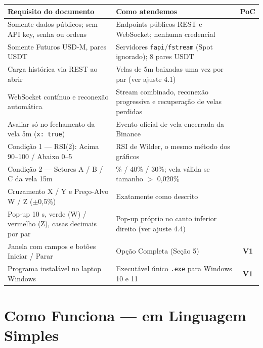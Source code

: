 \documentclass[11pt,a4paper]{article}
\newcommand{\icoCheck} {\textcolor{sinalW}{\ding{51}}}
\newcommand{\icoV}     {\textcolor{cyandk}{\textbf{V1}}}
\newcommand{\usdm}{USD\raisebox{0.15ex}{\textcircled{\raisebox{-0.05ex}{\tiny S}}}-M}
\begin{document}
\begin{center}
\small
\renewcommand{\arraystretch}{1.32}
\begin{tabularx}{\textwidth}{@{}>{\raggedright\arraybackslash}p{50mm} >{\raggedright\arraybackslash}X c@{}}
  \toprule
  \rowcolor{navy!8}
  \textbf{Requisito do documento} & \textbf{Como atendemos} & \textbf{PoC} \\
  \midrule
  Somente dados públicos; sem API key, senha ou ordens & Endpoints públicos REST e WebSocket; nenhuma credencial & \icoCheck \\
  Somente Futuros \usdm, pares USDT & Servidores \texttt{fapi}/\texttt{fstream} (Spot ignorado); 8 pares USDT & \icoCheck \\
  Carga histórica via REST ao abrir & Velas de 5m baixadas uma vez por par (ver ajuste 4.1) & \icoCheck \\
  WebSocket contínuo e reconexão automática & Stream combinado, reconexão progressiva e recuperação de velas perdidas & \icoCheck \\
  Avaliar só no fechamento da vela 5m (\texttt{x:\,true}) & Evento oficial de vela encerrada da Binance & \icoCheck \\
  Condição 1 --- RSI(2): Acima 90--100 / Abaixo 0--5 & RSI de Wilder, o mesmo método dos gráficos & \icoCheck \\
  Condição 2 --- Setores A / B / C da vela 15m & 30\% / 40\% / 30\%; vela válida se tamanho $>$ 0,020\% & \icoCheck \\
  Cruzamento X / Y e Preço-Alvo W / Z ($\pm$0,5\%) & Exatamente como descrito & \icoCheck \\
  Pop-up 10 s, verde (W) / vermelho (Z), casas decimais por par & Pop-up próprio no canto inferior direito (ver ajuste 4.4) & \icoCheck \\
  Janela com campos e botões Iniciar / Parar & Opção Completa (Seção 5) & \icoV \\
  Programa instalável no laptop Windows & Executável único \texttt{.exe} para Windows 10 e 11 & \icoV \\
  \bottomrule
\end{tabularx}
\end{center}

\section{Como Funciona --- em Linguagem Simples}
\end{document}
